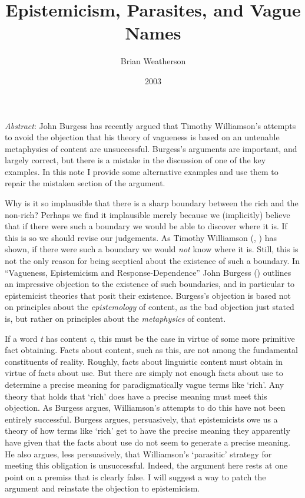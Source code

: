 \documentclass[
  11pt,
  letterpaper,
  DIV=11,
  numbers=noendperiod,
  twoside]{scrartcl}
\title{Epistemicism, Parasites, and Vague Names}
\author{Brian Weatherson}
\date{2003}
\renewenvironment{abstract}
 {\vspace{-1.25cm}
 \quotation\small\noindent\emph{Abstract}:}
 {\endquotation}
\renewenvironment{abstract}
 {\quotation\small\noindent\emph{Abstract}:}
 {\endquotation\vspace{-0.02cm}}
\begin{document}
\maketitle
\begin{abstract}
John Burgess has recently argued that Timothy Williamson's attempts to
avoid the objection that his theory of vagueness is based on an
untenable metaphysics of content are unsuccessful. Burgess's arguments
are important, and largely correct, but there is a mistake in the
discussion of one of the key examples. In this note I provide some
alternative examples and use them to repair the mistaken section of the
argument.
\end{abstract}


Why is it so implausible that there is a sharp boundary between the rich
and the non-rich? Perhaps we find it implausible merely because we
(implicitly) believe that if there were such a boundary we would be able
to discover where it is. If this is so we should revise our judgements.
As Timothy Williamson (,
) has shown, if there were
such a boundary we would \emph{not} know where it is. Still, this is not
the only reason for being sceptical about the existence of such a
boundary. In ``Vagueness, Epistemicism and Response-Dependence'' John
Burgess () outlines an impressive
objection to the existence of such boundaries, and in particular to
epistemicist theories that posit their existence. Burgess's objection is
based not on principles about the \emph{epistemology} of content, as the
bad objection just stated is, but rather on principles about the
\emph{metaphysics} of content.

If a word \emph{t} has content \emph{c}, this must be the case in virtue
of some more primitive fact obtaining. Facts about content, such as
this, are not among the fundamental constituents of reality. Roughly,
facts about linguistic content must obtain in virtue of facts about use.
But there are simply not enough facts about use to determine a precise
meaning for paradigmatically vague terms like `rich'. Any theory that
holds that `rich' does have a precise meaning must meet this objection.
As Burgess argues, Williamson's attempts to do this have not been
entirely successful. Burgess argues, persuasively, that epistemicists
owe us a theory of how terms like `rich' get to have the precise meaning
they apparently have given that the facts about use do not seem to
generate a precise meaning. He also argues, less persuasively, that
Williamson's `parasitic' strategy for meeting this obligation is
unsuccessful. Indeed, the argument here rests at one point on a premiss
that is clearly false. I will suggest a way to patch the argument and
reinstate the objection to epistemicism.
\end{document}
